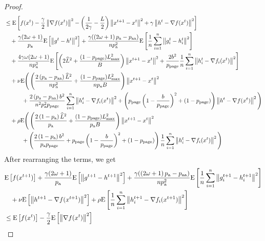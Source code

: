 \documentclass{article}
\newcommand*{\probavailable}{\ensuremath{p_{\textnormal{a}}}}
\newcommand*{\probpairaa}{\ensuremath{p_{\textnormal{aa}}}}
\newcommand*{\probpage}{\ensuremath{p_{\text{page}}}}
\begin{document}
\begin{proof}
\begin{align*}
      &\leq \Exp{f(x^t) - \frac{\gamma}{2}\norm{\nabla f(x^t)}^2 - \left(\frac{1}{2\gamma} - \frac{L}{2}\right)
      \norm{x^{t+1} - x^t}^2 + \gamma \norm{h^{t} - \nabla f(x^t)}^2}\nonumber\\
      &\quad + \frac{\gamma (2 \omega + 1)}{\probavailable}\Exp{\norm{g^{t} - h^t}^2}+ \frac{\gamma (\left(2 \omega + 1\right)\probavailable - \probpairaa)}{n \probavailable^2}\Exp{\frac{1}{n} \sum_{i=1}^n\norm{g^t_i - h^{t}_i}^2} \\
      &\quad + \frac{4 \gamma \omega (2 \omega + 1)}{n \probavailable^2} \Exp{\left(2 \widehat{L}^2 + \frac{(1 - \probpage)L_{\max}^2}{B}\right)\norm{x^{t+1} - x^{t}}^2 +  \frac{2b^2}{\probpage} \frac{1}{n}\sum_{i=1}^n \norm{h^t_i - \nabla f_i(x^{t})}^2} \\
      &\quad  + \nu {\rm E}\Bigg(\left(\frac{2 \left(\probavailable - \probpairaa\right) \widehat{L}^2}{n \probavailable^2} + \frac{(1 - \probpage)L_{\max}^2}{n \probavailable B}\right) \norm{x^{t+1} - x^{t}}^2\\
      &\qquad\quad + \frac{2\left(\probavailable - \probpairaa\right) b^2}{n^2 \probavailable^2 \probpage}\sum_{i=1}^n\norm{ h^t_i - \nabla f_i(x^{t})}^2 + \left(\probpage\left(1 - \frac{b}{\probpage}\right)^2 + (1 - \probpage)\right)\norm{h^{t} - \nabla f(x^{t})}^2\Bigg) \\
      &\quad + \rho {\rm E}\Bigg(\left(\frac{2\left(1 - \probavailable\right)\widehat{L}^2}{\probavailable} + \frac{(1 - \probpage)L_{\max}^2}{\probavailable B}\right) \norm{x^{t+1} - x^{t}}^2 \\
      &\qquad\quad +\left(\frac{2\left(1 - \probavailable\right)b^2}{\probavailable \probpage} + \probpage\left(1 - \frac{b}{\probpage}\right)^2 + (1 - \probpage)\right)\frac{1}{n}\sum_{i=1}^n\norm{h^{t}_i - \nabla f_i(x^{t})}^2\Bigg)\\
    \end{align*}
    After rearranging the terms, we get
    \begin{align*}
      &\Exp{f(x^{t + 1})} + \frac{\gamma (2 \omega + 1)}{\probavailable} \Exp{\norm{g^{t+1} - h^{t+1}}^2} + \frac{\gamma (\left(2 \omega + 1\right)\probavailable - \probpairaa)}{n \probavailable^2} \Exp{\frac{1}{n}\sum_{i=1}^n\norm{g^{t+1}_i - h^{t+1}_i}^2}\\
      &\quad  + \nu \Exp{\norm{h^{t+1} - \nabla f(x^{t+1})}^2} + \rho \Exp{\frac{1}{n}\sum_{i=1}^n\norm{h^{t+1}_i - \nabla f_i(x^{t+1})}^2}\\
      &\leq \Exp{f(x^t)} - \frac{\gamma}{2}\Exp{\norm{\nabla f(x^t)}^2} \\

\end{align*}
\end{proof}
\end{document}
